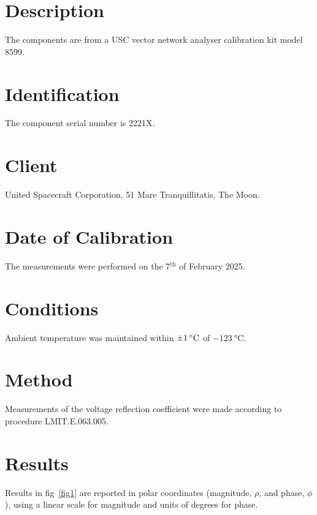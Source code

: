 \documentclass[11pt,a4paper]{article}
\date{\today}
\begin{document}
\pagestyle{fancy}
\raggedright        %
	
%
\section{Description}
The components are from a USC vector network analyser calibration kit model 8599. 

\section{Identification}
The component serial number is 2221X.

\section{Client}
United Spacecraft Corporation, 51 Mare Tranquillitatis, The Moon.

\section{Date of Calibration}
The measurements were performed on the 7$^\mathrm{th}$ of February 2025.

\section{Conditions}
Ambient temperature was maintained within $\SI{\pm 1}{\celsius}$ of $\SI{-123}{\celsius}$.

\section{Method}
Measurements of the voltage reflection coefficient were made according to procedure LMIT.E.063.005. 

\section{Results}
Results in fig~\ref{fig1} are reported in polar coordinates (magnitude, $\rho$, and phase, $\phi$), using a linear scale for magnitude and units of degrees for phase. 

\end{document}
